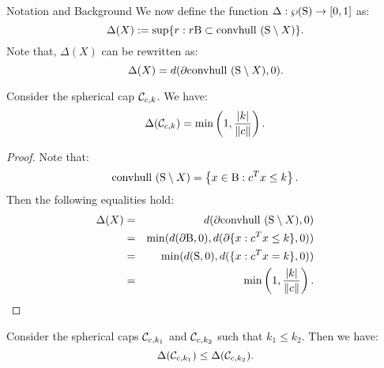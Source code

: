 \begin{subsection}{Notation and Background}
We now define the function $\Delta: \wp(\text{S}) \to [0,1]$ as:
\begin{equation}\label{shrinkage}
\Delta(X) := \sup \{r: r\text{B} \subset \mbox{convhull }(\text{S} \setminus X)\}.\end{equation}
Note that, $\Delta(X)$ can be rewritten as:
\begin{equation}\label{shrinkage2}
\Delta(X) =  d(\partial  \mbox{convhull }(\text{S} \setminus X), 0).
\end{equation}


\begin{lemma} \label{lemma:delta2} Consider the spherical cap $\mathcal{C}_{c,k}$. We have:
$$\Delta(\mathcal{C}_{c,k}) = \min\left(1, \frac{|k|}{\|c\|}\right).$$
\end{lemma}

\begin{proof}
Note that: $$\mbox{convhull }(\text{S} \setminus X)= \left\{x \in \text{B} : c^Tx \leq k \right\}.$$
Then the following equalities hold:
\begin{eqnarray}
\nonumber \Delta(X) &=& d(\partial \mbox{convhull }(\text{S} \setminus X), 0) \\
\nonumber &=& \min(d(\partial \text{B}, 0), d(\partial\{x : c^Tx \leq k\}, 0)) \\
\nonumber &=& \min(d(\text{S}, 0), d(\{x : c^Tx = k\}, 0)) \\
\nonumber &=& \min\left(1, \frac{|k|}{\|c\|}\right).
\end{eqnarray}
\end{proof}

\begin{corollary}\label{lemma:deltaMonotone} Consider the spherical caps $\mathcal{C}_{c, k_1}$ and $\mathcal{C}_{c, k_2}$ such that $k_1 \leq k_2$. Then we have: $$\Delta(\mathcal{C}_{c,k_1}) \leq \Delta(\mathcal{C}_{c,k_2}).$$
\end{corollary}
\end{subsection}

